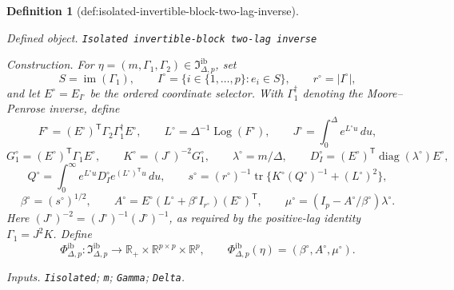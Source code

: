 \documentclass{article}
\newtheorem{definition}{Definition}
\begin{document}
\begin{definition}[def:isolated-invertible-block-two-lag-inverse]\label{def:isolated-invertible-block-two-lag-inverse}
\par\smallskip\noindent\emph{Defined object.} \texttt{Isolated invertible-\allowbreak{}block two-\allowbreak{}lag inverse}
\par\smallskip\noindent\emph{Construction.} For \(\eta=(m,\Gamma_1,\Gamma_2)\in\mathfrak I_{\Delta,p}^{\mathrm{ib}}\), set
\[
 S=\operatorname{im}(\Gamma_1),\qquad
 I^\circ=\{i\in\{1,\ldots,p\}:e_i\in S\},\qquad
 r^\circ=|I^\circ|,
\]
and let \(E^\circ=E_{I^\circ}\) be the ordered coordinate selector.  With \(\Gamma_1^\dagger\) denoting the Moore--Penrose inverse, define
\[
 F^\circ=(E^\circ)^{\mathsf T}\Gamma_2\Gamma_1^\dagger E^\circ,\qquad
 L^\circ=\Delta^{-1}\operatorname{Log}(F^\circ),\qquad
 J^\circ=\int_0^\Delta e^{L^\circ u}\,du,
\]
\[
 G_1^\circ=(E^\circ)^{\mathsf T}\Gamma_1E^\circ,\qquad
 K^\circ=(J^\circ)^{-2}G_1^\circ,\qquad
 \lambda^\circ=m/\Delta,\qquad
 D_I^\circ=(E^\circ)^{\mathsf T}\operatorname{diag}(\lambda^\circ)E^\circ,
\]
\[
 Q^\circ=\int_0^\infty e^{L^\circ u}D_I^\circ e^{(L^\circ)^{\mathsf T}u}\,du,\qquad
 s^\circ=(r^\circ)^{-1}\operatorname{tr}\{K^\circ(Q^\circ)^{-1}+(L^\circ)^2\},
\]
\[
 \beta^\circ=(s^\circ)^{1/2},\qquad
 A^\circ=E^\circ(L^\circ+\beta^\circ I_{r^\circ})(E^\circ)^{\mathsf T},\qquad
 \mu^\circ=(I_p-A^\circ/\beta^\circ)\lambda^\circ.
\]
Here \((J^\circ)^{-2}=(J^\circ)^{-1}(J^\circ)^{-1}\), as required by the positive-lag identity \(\Gamma_1=J^2K\).  Define
\[
 \Phi_{\Delta,p}^{\mathrm{ib}}:\mathfrak I_{\Delta,p}^{\mathrm{ib}}
 \longrightarrow\mathbb R_+\times\mathbb R^{p\times p}\times\mathbb R^p,
 \qquad
 \Phi_{\Delta,p}^{\mathrm{ib}}(\eta)=(\beta^\circ,A^\circ,\mu^\circ).
\]
\par\smallskip\noindent\emph{Inputs.} \texttt{Iisolated}; \texttt{m}; \texttt{Gamma}; \texttt{Delta}.
\end{definition}
\end{document}
